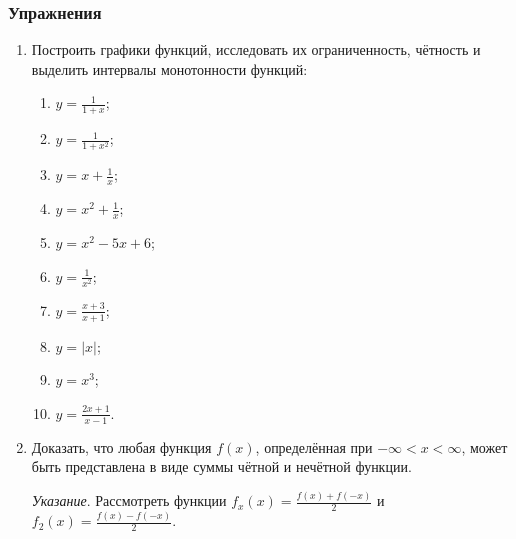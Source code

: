 \subsubsection{Упражнения}
\begin{enumerate}
	\item Построить графики функций, исследовать их ограниченность, чётность
		и выделить интервалы монотонности функций:
		\begin{enumerate}
			\item $y = \frac{1}{1 + x}$;
			\item $y = \frac{1}{1 + x^2}$;
			\item $y = x + \frac{1}{x}$;
			\item $y = x^2 + \frac{1}{x}$;
			\item $y = x^2 - 5x + 6$;
			\item $y = \frac{1}{x^2}$;
			\item $y = \frac{x + 3}{x + 1}$;
			\item $y = |x|$;
			\item $y = x^3$;
			\item $y = \frac{2x + 1}{x - 1}$.
		\end{enumerate}
	\item Доказать, что любая функция $f(x)$, определённая при $-\infty < x
		< \infty$, может быть представлена в виде суммы чётной и
		нечётной функции.

		\textit{Указание}. Рассмотреть функции $f_x(x) = \frac{f(x) +
		f(-x)}{2}$ и $f_2(x) = \frac{f(x) - f(-x)}{2}$.
\end{enumerate}

